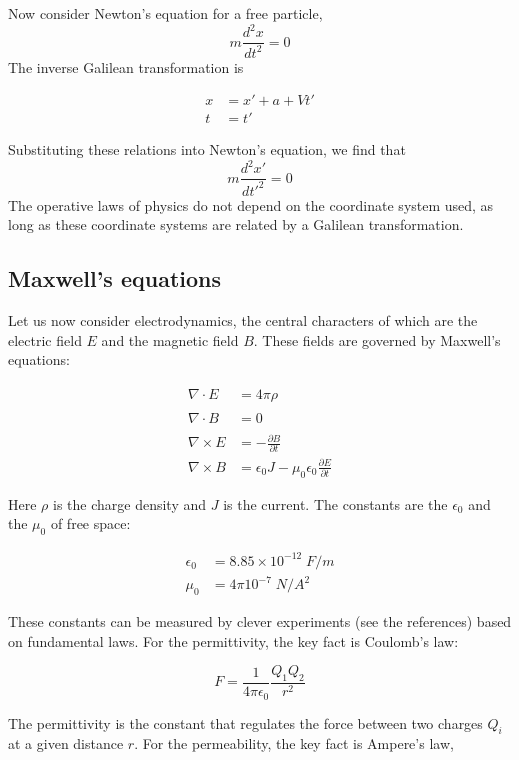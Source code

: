 Now consider Newton's equation for a free particle,
\[
    m\frac{d^2x}{dt^2} = 0
\]
The inverse Galilean transformation is

\begin{align}
  x &= x' + a + Vt' \\
  t &= t'
\end{align}

Substituting these relations into Newton's equation, we find
that
\[
    m\frac{d^2x'}{dt'^2} = 0
\]
The operative laws of physics do not depend on the 
coordinate system used, as long as these coordinate
systems are related by a Galilean transformation.


\subsection{Maxwell's equations}

Let us now consider electrodynamics, the central characters
of which are the electric field $E$ and the magnetic field
$B$.  These fields are governed by Maxwell's equations:

\begin{align}
 \nabla\cdot E &= 4\pi\rho \phantom{\frac{2}{2}}\\
 \nabla\cdot B &= 0 \phantom{\frac{2}{2}}\\
 \nabla\times E &= - \frac{\partial B}{\partial t} \\
 \nabla\times B &= \epsilon_0J -\mu_0\epsilon_0\frac{\partial E}{\partial t} 
\end{align}

Here $\rho$ is the charge density and $J$ is the current.  
The constants are the 
$\epsilon_0$ and the 
 $\mu_0$ of  free space:

\begin{align}
\epsilon_0 &= 8.85 \times 10^{-12} \; F/m \\
\mu_0 &= 4\pi 10^{-7} \; N/A^2
\end{align}

These constants can be measured by clever experiments
(see the references) based on fundamental 
laws.  For the permittivity, the key fact
 is Coulomb's law:

\begin{equation}
\label{coulombs_law}
  F = \frac{1}{4\pi \epsilon_0} \frac{Q_1Q_2}{r^2}
\end{equation}

The permittivity is the constant that regulates the force
between two charges $Q_i$ at a given distance $r$.   For the permeability,
the key fact is Ampere's law,

